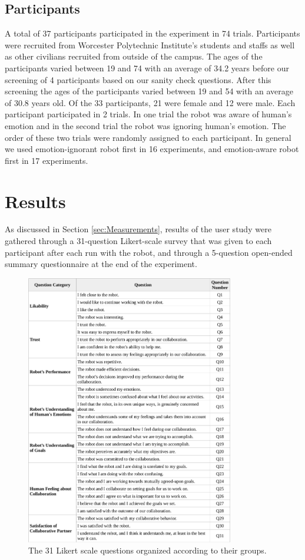 \documentclass[12pt]{report}
\begin{document}
\subsection{Participants}
\label{sec:Participants}
A total of 37 participants participated in the experiment in 74 trials.
Participants were recruited from Worcester Polytechnic Institute's students and
staffs as well as other civilians recruited from outside of the campus. The ages
of the participants varied between 19 and 74 with an average of 34.2 years
before our screening of 4 participants based on our sanity check questions. After
this screening the ages of the participants varied between 19 and 54 with an
average of 30.8 years old. Of the 33 participants, 21 were female and 12
were male. Each participant participated in 2 trials. In one trial the robot was
aware of human's emotion and in the second trial the robot was ignoring human's
emotion. The order of these two trials were randomly assigned to each
participant. In general we used emotion-ignorant robot first in 16 experiments,
and emotion-aware robot first in 17 experiments.

\section{Results}

As discussed in Section \ref{sec:Measurements}, results of the user study were
gathered through a 31-question Likert-scale survey that was given to each
participant after each run with the robot, and through a 5-question open-ended
summary questionnaire at the end of the experiment.

\begin{figure}[h]
\centering
\includegraphics[width=0.81\textwidth]{figure/table1-croped.pdf}
\caption{\fontsize{10pt}{10pt}\selectfont The 31 Likert scale questions
organized according to their groups.}
\label{fig:31questions-table}
\end{figure}
\end{document}
